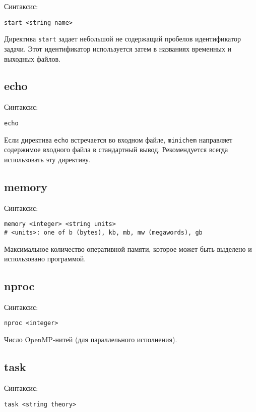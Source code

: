 \documentclass[a4paper, 12pt]{article}
\begin{document}
Синтаксис:

\begin{lstlisting}
start <string name>
\end{lstlisting}

Директива \texttt{start} задает небольшой не содержащий пробелов идентификатор задачи. Этот идентификатор используется затем в названиях временных и выходных файлов.

\subsection{echo}

Синтаксис:

\begin{lstlisting}
echo
\end{lstlisting}

Если директива \texttt{echo} встречается во входном файле, \texttt{minichem} направляет содержимое входного файла в стандартный вывод. Рекомендуется всегда использовать эту директиву.

\subsection{memory}

Синтаксис:

\begin{lstlisting}
memory <integer> <string units>
# <units>: one of b (bytes), kb, mb, mw (megawords), gb
\end{lstlisting}

Максимальное количество оперативной памяти, которое может быть выделено и использовано программой.

\subsection{nproc}

Синтаксис:

\begin{lstlisting}
nproc <integer>
\end{lstlisting}

Число OpenMP-нитей (для параллельного исполнения).

\subsection{task}

Синтаксис:

\begin{lstlisting}
task <string theory>
\end{lstlisting}
\end{document}
